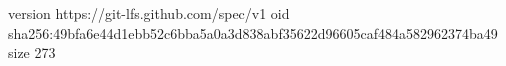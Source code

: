 version https://git-lfs.github.com/spec/v1
oid sha256:49bfa6e44d1ebb52c6bba5a0a3d838abf35622d96605caf484a582962374ba49
size 273
